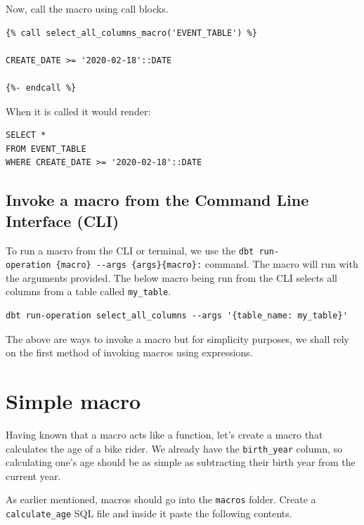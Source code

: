 \documentclass[
]{book}
\begin{document}
Now, call the macro using call blocks.

\begin{verbatim}
{% call select_all_columns_macro('EVENT_TABLE') %}

CREATE_DATE >= '2020-02-18'::DATE

{%- endcall %}
\end{verbatim}

When it is called it would render:

\begin{verbatim}
SELECT *
FROM EVENT_TABLE
WHERE CREATE_DATE >= '2020-02-18'::DATE
\end{verbatim}

\hypertarget{invoke-a-macro-from-the-command-line-interface-cli}{%
\subsection{Invoke a macro from the Command Line Interface (CLI)}\label{invoke-a-macro-from-the-command-line-interface-cli}}

To run a macro from the CLI or terminal, we use the \texttt{dbt\ run-operation\ \{macro\}\ -\/-args\ \textquotesingle{}\{args\}\textquotesingle{}\{macro\}:} command. The macro will run with the arguments provided. The below macro being run from the CLI selects all columns from a table called \texttt{my\_table}.

\begin{verbatim}
dbt run-operation select_all_columns --args '{table_name: my_table}'
\end{verbatim}

The above are ways to invoke a macro but for simplicity purposes, we shall rely on the first method of invoking macros using expressions.

\hypertarget{simple-macro}{%
\section{Simple macro}\label{simple-macro}}

Having known that a macro acts like a function, let's create a macro that calculates the age of a bike rider. We already have the \texttt{birth\_year} column, so calculating one's age should be as simple as subtracting their birth year from the current year.

As earlier mentioned, macros should go into the \texttt{macros} folder. Create a \texttt{calculate\_age} SQL file and inside it paste the following contents.
\end{document}
